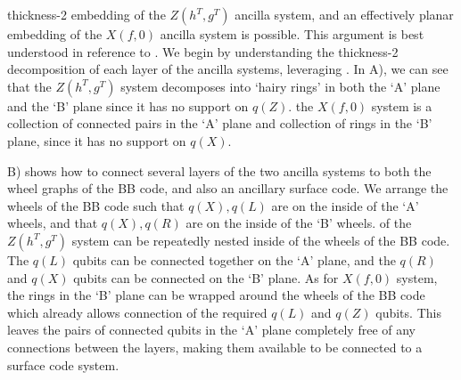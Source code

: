 \documentclass{article}
\begin{document}
 thickness-2 embedding of the $Z(h^T,g^T)$ ancilla system, and an effectively planar embedding of the $X(f,0)$ ancilla system is possible. This argument is best understood in reference to . We begin by understanding the thickness-2 decomposition of each layer of the ancilla systems, leveraging . In  A), we can see that  the $Z(h^T,g^T)$ system decomposes into `hairy rings' in both the `A' plane and the `B' plane since it has no support on $q(Z)$.  the $X(f,0)$ system is a collection of connected pairs in the `A' plane and collection of rings in the `B' plane, since it has no support on $q(X)$.


 B) shows how to connect several layers of the two ancilla systems to both the wheel graphs of the BB code, and also an ancillary surface code. We arrange the wheels of the BB code such that $q(X),q(L)$ are on the inside of the `A' wheels, and that $q(X),q(R)$ are on the inside of the `B' wheels.  of the $Z(h^T,g^T)$ system can be repeatedly nested inside of the wheels of the BB code. The $q(L)$ qubits can be connected together on the `A' plane, and the $q(R)$ and $q(X)$ qubits can be connected on the `B' plane. As for  $X(f,0)$ system, the rings in the `B' plane can be wrapped around the wheels of the BB code which already allows connection of the required $q(L)$ and $q(Z)$ qubits. This leaves the pairs of connected qubits in the `A' plane completely free of any connections between the layers, making them available to be connected to a surface code system.




\ifdefined\maindocument
\else
    
    
    
\end{document}
